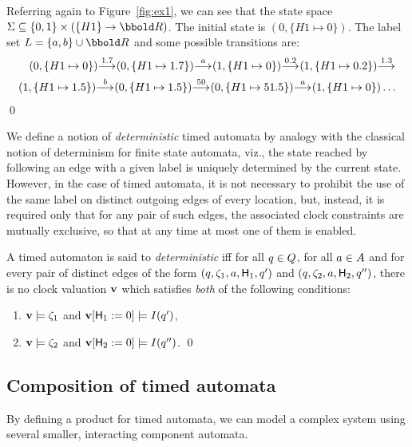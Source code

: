 {\begin{exampleb}
Referring again to Figure~\ref{fig:ex1}, we can see that the state
space $\States \subseteq \{0,1\} \cross (\{H1\} \fun \Time)$. The initial
state is $(0,\{H1 \mapsto 0\})$. The label set $\Labels = \{a, b\} \cup
\Time$ and some possible transitions are:
\begin{eqnarray*}
(0,\{H1 \mapsto 0\}) {\mathrel{{\stackrel{1.7}{\longrightarrow_{\mathrm{{}}}}}}} (0,\{H1 \mapsto 1.7\}) {\mathrel{{\stackrel{a}{\longrightarrow_{\mathrm{{}}}}}}} (1,\{H1 \mapsto 0\}) {\mathrel{{\stackrel{0.2}{\longrightarrow_{\mathrm{{}}}}}}} (1,\{H1 \mapsto 0.2\}) {\mathrel{{\stackrel{1.3}{\longrightarrow_{\mathrm{{}}}}}}} \\
(1,\{H1 \mapsto 1.5\}) {\mathrel{{\stackrel{b}{\longrightarrow_{\mathrm{{}}}}}}} (0,\{H1 \mapsto 1.5\}) {\mathrel{{\stackrel{50}{\longrightarrow_{\mathrm{{}}}}}}} (0,\{H1 \mapsto 51.5\}) {\mathrel{{\stackrel{a}{\longrightarrow_{\mathrm{{}}}}}}} (1,\{H1 \mapsto 0\}) \ldots
\end{eqnarray*}
\qed
\end{exampleb}

We define a notion of \emph{deterministic} timed automata by analogy
with the classical notion of determinism for finite state
automata, viz., the state reached by following an edge with a given
label is uniquely determined by the current state. However, in the case
of timed automata, it is not necessary to prohibit the use of the same label on
distinct outgoing edges of every location, but, instead, it is required only 
that for any pair of such edges, the associated  clock constraints are mutually
exclusive, so that at any time at most one of them is enabled.
\begin{definition}
A timed automaton is said to \emph{deterministic} iff for all 
$q \in Q$, for all $a \in A$ and for every pair of
distinct edges of the form $(q,{\zeta}_1, a, {\sf H}_1, q')$ and 
$(q, {\zeta}_2, a, {\sf H}_2, q'')$, there is no
clock valuation $\mathbf{v}$ which satisfies \emph{both} of the
following conditions:
\begin{enumerate}
\item $\mathbf{v} \models {\zeta}_1$ and $\mathbf{v}[{\sf H}_1:=0] \models 
  I(q')$,
\item $\mathbf{v} \models {\zeta}_2$ and $\mathbf{v}[{\sf H}_2:=0] \models 
  I(q'')$. 
\qed
\end{enumerate}
\end{definition}


\subsection{Composition of timed automata}\label{ss:msctacomposition}
By defining a product for timed automata, we can model a complex system using
several smaller, interacting component automata.

}
